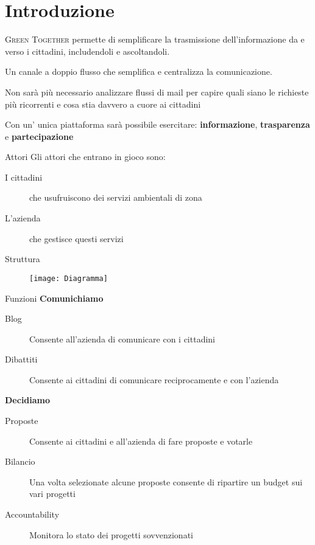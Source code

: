 \section{Introduzione}
\begin{frame}{}

  \textsc{Green Together} permette di semplificare la trasmissione dell'informazione da e verso i cittadini, includendoli e ascoltandoli.
  \pause
  \bigskip

  Un canale a doppio flusso che semplifica e centralizza la comunicazione.
  \pause

\end{frame}
\begin{frame}
  Non sarà più necessario analizzare flussi di mail per capire quali siano le richieste più ricorrenti e cosa stia davvero a cuore ai cittadini
  \pause

  Con un' unica piattaforma sarà possibile esercitare:
  \textbf{informazione},  \textbf{trasparenza} e  \textbf{partecipazione}
\end{frame}
\begin{frame}{Attori}
  Gli attori che entrano in gioco sono:
  \begin{description}
    \item[I cittadini] che usufruiscono dei servizi ambientali di zona
    \item[L'azienda] che gestisce questi servizi
  \end{description}


\end{frame}

\begin{frame}{Struttura}

  \begin{figure}

    \texttt{[image: Diagramma]}
  \end{figure}

\end{frame}
\begin{frame}{Funzioni}
  \textbf{Comunichiamo}
  \begin{description}
    \item[Blog] Consente all'azienda di comunicare con i cittadini
    \item[Dibattiti] Consente ai cittadini di comunicare reciprocamente e con l'azienda
  \end{description}
  \textbf{Decidiamo}

  \begin{description}
    \item[Proposte] Consente ai cittadini e all'azienda di fare proposte e votarle
    \item[Bilancio] Una volta selezionate alcune proposte consente di ripartire un budget sui vari progetti
    \item[Accountability] Monitora lo stato dei progetti sovvenzionati
  \end{description}
\end{frame}